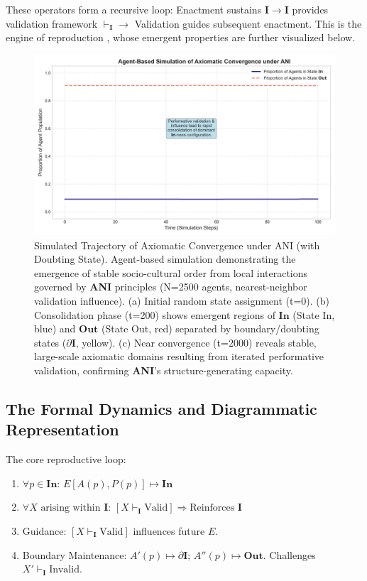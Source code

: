 \documentclass{article}
\newcommand{\ANI}{\textbf{ANI}}             %
\newcommand{\Isness}{\mathbf{I}}            %
\newcommand{\Inness}{\mathbf{In}}           %
\newcommand{\Outness}{\mathbf{Out}}         %
\newcommand{\enactment}{\ensuremath{\mapsto}} %
\newcommand{\validates}[1]{\ensuremath{\vdash_{#1}}} %
\newcommand{\boundary}[1]{\ensuremath{\partial #1}} %
\begin{document}
These operators form a recursive loop: Enactment sustains $\Isness \rightarrow \Isness$ provides validation framework $\validates{\Isness} \rightarrow$ Validation guides subsequent enactment. This is the engine of reproduction \citep{Bourdieu1990}, whose emergent properties are further visualized below.

\begin{figure}[h!]
    \centering
    \includegraphics[width=\textwidth]{figures/ani_figure2_abm_convergence.png}
    \caption{Simulated Trajectory of Axiomatic Convergence under ANI (with Doubting State). Agent-based simulation demonstrating the emergence of stable socio-cultural order from local interactions governed by \ANI{} principles (N=2500 agents, nearest-neighbor validation influence). (a) Initial random state assignment (t=0). (b) Consolidation phase (t=200) shows emergent regions of $\Inness$ (State In, blue) and $\Outness$ (State Out, red) separated by boundary/doubting states ($\boundary{\Isness}$, yellow). (c) Near convergence (t=2000) reveals stable, large-scale axiomatic domains resulting from iterated performative validation, confirming \ANI{}'s structure-generating capacity.}
    \label{fig:convergence_grids}
\end{figure}

\subsection{The Formal Dynamics and Diagrammatic Representation}

The core reproductive loop:
\begin{enumerate}
    \item $\forall p \in \Inness$: $E[A(p), P(p)] \enactment \Inness$
    \item $\forall X \text{ arising within } \Isness$: $[X \validates{\Isness} \text{Valid}] \Rightarrow \text{Reinforces } \Isness$
    \item Guidance: $[X \validates{\Isness} \text{Valid}]$ influences future $E$.
    \item Boundary Maintenance: $A'(p) \enactment \boundary{\Isness}$; $A''(p) \enactment \Outness$. Challenges $X' \validates{\Isness} \text{Invalid}$.
\end{enumerate}
\end{document}

